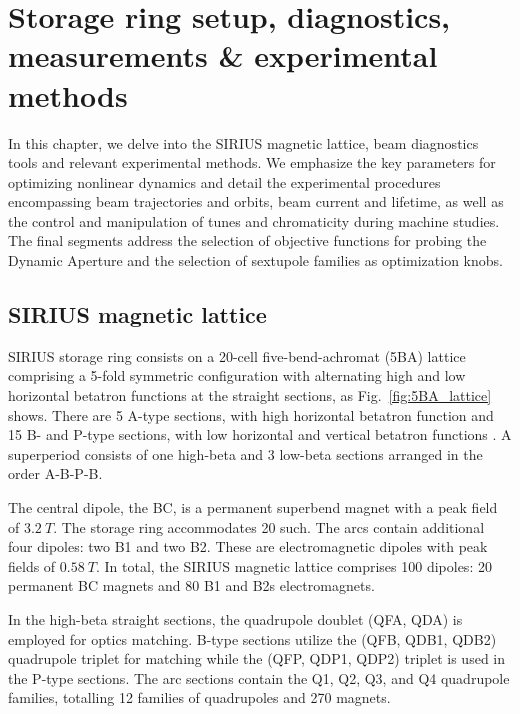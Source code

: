 \chapter{Storage ring setup, diagnostics, measurements \& experimental methods}
In this chapter, we delve into the SIRIUS magnetic lattice, beam diagnostics tools and relevant experimental methods. We emphasize the key parameters  for optimizing nonlinear dynamics and detail the experimental procedures encompassing beam trajectories and orbits, beam current and lifetime, as well as the control and manipulation of tunes and chromaticity during machine studies. The final segments address the selection of objective functions for probing the Dynamic Aperture and the selection of sextupole families as optimization knobs.

\section{SIRIUS magnetic lattice}
SIRIUS storage ring consists on a 20-cell five-bend-achromat (5BA) lattice comprising a 5-fold symmetric configuration with alternating high and low horizontal betatron functions at the straight sections, as Fig.~\ref{fig:5BA_lattice} shows. There are 5 A-type sections, with high horizontal betatron function and 15 B- and P-type sections, with low horizontal and vertical betatron functions \cite{liu_new_2016}.
A superperiod consists of one high-beta and 3 low-beta sections arranged in the order A-B-P-B.

The central dipole, the BC, is a permanent superbend magnet with a peak field of $3.2~\unit{T}$. The storage ring accommodates 20 such. The arcs contain additional four dipoles: two B1 and two B2. These are electromagnetic dipoles with peak fields of $0.58~\unit{T}$. In total, the SIRIUS magnetic lattice comprises 100 dipoles: 20 permanent BC magnets and 80 B1 and B2s electromagnets.

In the high-beta straight sections, the quadrupole doublet (QFA, QDA) is employed for optics matching. B-type sections utilize the (QFB, QDB1, QDB2) quadrupole triplet for matching while the (QFP, QDP1, QDP2) triplet is used in the P-type sections. The arc sections contain the Q1, Q2, Q3, and Q4 quadrupole families, totalling 12 families of quadrupoles and 270 magnets.

